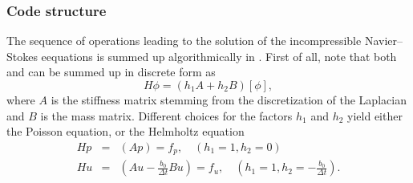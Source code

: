 \documentclass{sig-alternate}
\begin{document}
\subsubsection{Code structure}
\label{sec:code}

The sequence of operations leading to the solution of the incompressible
Navier--Stokes  eequations is summed up algorithmically in .  
First of all, note that both  and  can be summed up in discrete form as
$$H \phi=(h_1 A+h_2 B)[\phi],$$
where $A$ is the stiffness matrix stemming from the discretization of the Laplacian and $B$ is the mass matrix. 
Different choices for the factors $h_1$ and $h_2$ yield either the Poisson equation, or the Helmholtz equation
\begin{eqnarray}
Hp &=& (Ap)=f_p, \quad (h_1=1, h_2=0)\\
Hu &=&(Au -\frac{b_0}{\Delta t} B u)=f_u, \quad (h_1=1, h_2=-\frac{b_0}{\Delta t}).
\end{eqnarray}
\end{document}
